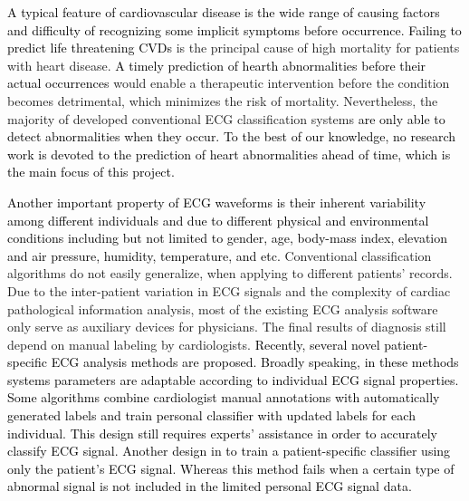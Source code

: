 \textcolor{black}{A typical feature of cardiovascular disease is the wide range of causing factors and difficulty of recognizing some implicit symptoms before occurrence\cite{wilson1998prediction, whooley2008depressive}. Failing to predict life threatening CVDs} %
is the principal cause of high mortality for patients with heart disease. 
\textcolor{black}{A timely prediction of hearth abnormalities before their actual occurrences }%
would enable a therapeutic intervention %
before the condition becomes detrimental, which minimizes the risk of mortality. Nevertheless, the majority of developed conventional ECG classification systems  \textcolor{black}{are only able to detect abnormalities when they occur. To the best of our knowledge, no research work is devoted to the prediction of heart abnormalities ahead of time, which is the main focus of this project\cite{jambukia2015classification, advancewarning}.} %

\textcolor{black}{Another important property of ECG waveforms is their inherent variability among different individuals and due to different physical and environmental conditions including but not limited to gender, age, body-mass index, elevation and air pressure, humidity, temperature, and etc\cite{agesex,intervaria}.}
Conventional classification algorithms do not easily generalize, when %
applying to different patients' records\cite{llamedo2012automatic}. 
Due to the inter-patient variation in ECG signals and the complexity of cardiac pathological information analysis, most of the existing ECG analysis software only serve as auxiliary devices for physicians. The final results of diagnosis still depend on manual labeling by cardiologists. \textcolor{black}{Recently, several novel patient-specific ECG analysis methods are proposed. Broadly speaking, in these methods systems parameters are adaptable according to individual ECG signal properties\cite{Hu_et_al,deChazal2006,llamedo2012automatic,bbnn,ince2009generic,Kiranyaz}. Some algorithms combine cardiologist manual annotations with automatically generated labels and train personal classifier with updated labels for each individual\cite{Hu_et_al,deChazal2006,llamedo2012automatic}. This design still requires experts' assistance in order to accurately classify ECG signal. Another design in to train a patient-specific classifier using only the patient's ECG signal. Whereas this method fails when a certain type of abnormal signal is not included in the limited personal ECG signal data.}%


